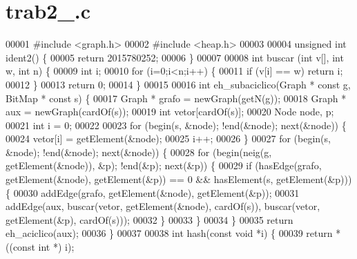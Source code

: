 \section{trab2\+\_.\+c}
\label{trab2__2015780252_8c_source}

\begin{DoxyCode}
00001 \textcolor{preprocessor}{#include <graph.h>}
00002 \textcolor{preprocessor}{#include <heap.h>}
00003 
00004 \textcolor{keywordtype}{unsigned} \textcolor{keywordtype}{int} ident2() \{
00005         \textcolor{keywordflow}{return} 2015780252;
00006 \}
00007 
00008 \textcolor{keywordtype}{int} buscar (\textcolor{keywordtype}{int} v[], \textcolor{keywordtype}{int} w, \textcolor{keywordtype}{int} n) \{
00009         \textcolor{keywordtype}{int} i;
00010         \textcolor{keywordflow}{for} (i=0;i<n;i++) \{
00011                 \textcolor{keywordflow}{if} (v[i] == w) \textcolor{keywordflow}{return} i;
00012         \}
00013         \textcolor{keywordflow}{return} 0;
00014 \}
00015 
00016 \textcolor{keywordtype}{int} eh_subaciclico(Graph * \textcolor{keyword}{const} g, BitMap * \textcolor{keyword}{const} s) \{
00017         Graph * grafo = newGraph(getN(g));
00018         Graph * aux = newGraph(cardOf(s));
00019         \textcolor{keywordtype}{int} vetor[cardOf(s)];
00020         Node node, p;
00021         \textcolor{keywordtype}{int} i = 0;
00022 
00023         \textcolor{keywordflow}{for} (begin(s, &node); !end(&node); next(&node)) \{
00024                 vetor[i] = getElement(&node);
00025                 i++;
00026         \}
00027         \textcolor{keywordflow}{for} (begin(s, &node); !end(&node); next(&node)) \{
00028                 \textcolor{keywordflow}{for} (begin(neig(g, getElement(&node)), &p); !end(&p); next(&p)) \{
00029                         \textcolor{keywordflow}{if} (hasEdge(grafo, getElement(&node), getElement(&p)) == 0 && 
      hasElement(s, getElement(&p))) \{
00030                                 addEdge(grafo, getElement(&node), getElement(&p));
00031                                 addEdge(aux, buscar(vetor, getElement(&node), 
      cardOf(s)), buscar(vetor, getElement(&p), cardOf(s)));
00032                         \}
00033                 \}
00034         \}
00035         \textcolor{keywordflow}{return} eh_aciclico(aux);
00036 \}
00037 
00038 \textcolor{keywordtype}{int} hash(\textcolor{keyword}{const} \textcolor{keywordtype}{void} *i) \{
00039         \textcolor{keywordflow}{return} *((\textcolor{keyword}{const} \textcolor{keywordtype}{int} *) i);

\end{DoxyCode}
